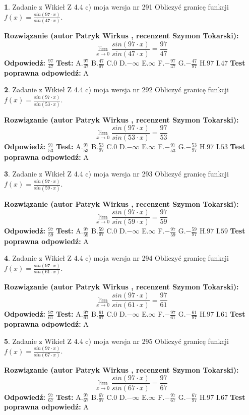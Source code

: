 \documentclass[12pt, a4paper]{article}
\theoremstyle{definition} %
\newtheorem{zad}{}
\newcommand{\zadStart}[1]{\begin{zad}#1\newline}
\newcommand{\zadStop}{\end{zad}}
\newcommand{\rozwStart}[2]{\noindent \textbf{Rozwiązanie (autor #1 , recenzent #2): }\newline}
\newcommand{\rozwStop}{\newline}
\newcommand{\odpStart}{\noindent \textbf{Odpowiedź:}\newline}
\newcommand{\odpStop}{\newline}
\newcommand{\testStart}{\noindent \textbf{Test:}\newline}
\newcommand{\testStop}{\newline}
\newcommand{\kluczStart}{\noindent \textbf{Test poprawna odpowiedź:}\newline}
\newcommand{\kluczStop}{\newline}
\begin{document}
\zadStart{Zadanie z Wikieł Z 4.4 c) moja wersja nr 291}
Obliczyć granicę funkcji $f(x)=\frac{sin(97\cdot x)}{sin(47\cdot x)}$.
\zadStop
\rozwStart{Patryk Wirkus}{Szymon Tokarski}
$$\lim\limits_{x\to 0}\frac{sin(97\cdot x)}{sin(47\cdot x)}=
\frac{97}{47}$$
\rozwStop
\odpStart
$\frac{97}{47}$
\odpStop
\testStart
A.$\frac{97}{47}$
B.$\frac{47}{97}$
C.$0$
D.$-\infty$
E.$\infty$
F.$-\frac{97}{47}$
G.$-\frac{47}{97}$
H.$97$
I.$47$
\testStop
\kluczStart
A
\kluczStop



\zadStart{Zadanie z Wikieł Z 4.4 c) moja wersja nr 292}
Obliczyć granicę funkcji $f(x)=\frac{sin(97\cdot x)}{sin(53\cdot x)}$.
\zadStop
\rozwStart{Patryk Wirkus}{Szymon Tokarski}
$$\lim\limits_{x\to 0}\frac{sin(97\cdot x)}{sin(53\cdot x)}=
\frac{97}{53}$$
\rozwStop
\odpStart
$\frac{97}{53}$
\odpStop
\testStart
A.$\frac{97}{53}$
B.$\frac{53}{97}$
C.$0$
D.$-\infty$
E.$\infty$
F.$-\frac{97}{53}$
G.$-\frac{53}{97}$
H.$97$
I.$53$
\testStop
\kluczStart
A
\kluczStop



\zadStart{Zadanie z Wikieł Z 4.4 c) moja wersja nr 293}
Obliczyć granicę funkcji $f(x)=\frac{sin(97\cdot x)}{sin(59\cdot x)}$.
\zadStop
\rozwStart{Patryk Wirkus}{Szymon Tokarski}
$$\lim\limits_{x\to 0}\frac{sin(97\cdot x)}{sin(59\cdot x)}=
\frac{97}{59}$$
\rozwStop
\odpStart
$\frac{97}{59}$
\odpStop
\testStart
A.$\frac{97}{59}$
B.$\frac{59}{97}$
C.$0$
D.$-\infty$
E.$\infty$
F.$-\frac{97}{59}$
G.$-\frac{59}{97}$
H.$97$
I.$59$
\testStop
\kluczStart
A
\kluczStop



\zadStart{Zadanie z Wikieł Z 4.4 c) moja wersja nr 294}
Obliczyć granicę funkcji $f(x)=\frac{sin(97\cdot x)}{sin(61\cdot x)}$.
\zadStop
\rozwStart{Patryk Wirkus}{Szymon Tokarski}
$$\lim\limits_{x\to 0}\frac{sin(97\cdot x)}{sin(61\cdot x)}=
\frac{97}{61}$$
\rozwStop
\odpStart
$\frac{97}{61}$
\odpStop
\testStart
A.$\frac{97}{61}$
B.$\frac{61}{97}$
C.$0$
D.$-\infty$
E.$\infty$
F.$-\frac{97}{61}$
G.$-\frac{61}{97}$
H.$97$
I.$61$
\testStop
\kluczStart
A
\kluczStop



\zadStart{Zadanie z Wikieł Z 4.4 c) moja wersja nr 295}
Obliczyć granicę funkcji $f(x)=\frac{sin(97\cdot x)}{sin(67\cdot x)}$.
\zadStop
\rozwStart{Patryk Wirkus}{Szymon Tokarski}
$$\lim\limits_{x\to 0}\frac{sin(97\cdot x)}{sin(67\cdot x)}=
\frac{97}{67}$$
\rozwStop
\odpStart
$\frac{97}{67}$
\odpStop
\testStart
A.$\frac{97}{67}$
B.$\frac{67}{97}$
C.$0$
D.$-\infty$
E.$\infty$
F.$-\frac{97}{67}$
G.$-\frac{67}{97}$
H.$97$
I.$67$
\testStop
\kluczStart
A
\kluczStop
\end{document}
